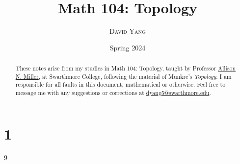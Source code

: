 \documentclass[11pt]{article}
\begin{document}
\title{\LARGE \textbf{Math 104: Topology}}
\date{Spring 2024}
\author{\textsc{David Yang}}

\maketitle

\begin{abstract}
These notes arise from my studies in Math 104: Topology, taught by 
Professor \href{https://sites.google.com/view/anmiller/}{Allison N. Miller}, at Swarthmore College, following the material of Munkre's \textit{Topology}.
I am responsible for all faults in this document, mathematical or otherwise.
Feel free to message me with any suggestions or corrections at \href{mailto:dyang5@swarthmore.edu}{dyang5@swarthmore.edu}.
\end{abstract}

\tableofcontents

\chapter{1}{9}
\end{document}
